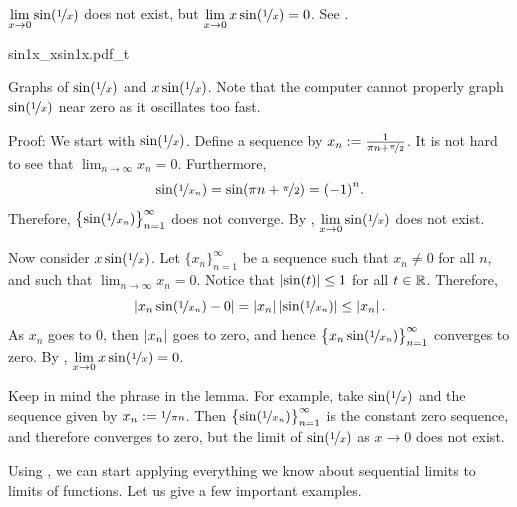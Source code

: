 \begin{example}
$\displaystyle \lim_{x \to 0} \sin( \nicefrac{1}{x} )$
does not exist, but 
$\displaystyle \lim_{x \to 0} x\sin( \nicefrac{1}{x} ) = 0$.
See .

\begin{myfigureht}
{sin1x_xsin1x.pdf_t}
\caption{Graphs of $\sin(\nicefrac{1}{x})$ and $x \sin(\nicefrac{1}{x})$.
Note that the computer cannot properly graph $\sin(\nicefrac{1}{x})$
near zero as it oscillates too fast.\label{figsin1x}}
\end{myfigureht}

Proof:
We start with $\sin(\nicefrac{1}{x})$.  Define a sequence
by
$x_n := \frac{1}{\pi n + \nicefrac{\pi}{2}}$.  It is not hard to see
that $\lim_{n\to\infty} x_n = 0$.  Furthermore,
\begin{equation*}
\sin ( \nicefrac{1}{x_n} )
=
\sin (\pi n + \nicefrac{\pi}{2})
= {(-1)}^n .
\end{equation*}
Therefore, $\bigl\{ \sin ( \nicefrac{1}{x_n} ) \bigr\}_{n=1}^\infty$ does not converge.
By
, 
$\displaystyle \lim_{x \to 0} \sin( \nicefrac{1}{x} )$ does not exist.

Now consider $x\sin(\nicefrac{1}{x})$.  Let $\{ x_n \}_{n=1}^\infty$ be a sequence
such that $x_n \not= 0$ for all $n$, and such that $\lim_{n\to\infty} x_n = 0$.
Notice that $\left\lvert {\sin(t)} \right\rvert \leq 1$ for all $t \in {\mathbb{R}}$.  Therefore,
\begin{equation*}
\left\lvert {x_n\sin(\nicefrac{1}{x_n})-0} \right\rvert
=
\left\lvert {x_n} \right\rvert\left\lvert {\sin(\nicefrac{1}{x_n})} \right\rvert
\leq
\left\lvert {x_n} \right\rvert .
\end{equation*}
As $x_n$ goes to 0, then $\left\lvert {x_n} \right\rvert$ goes to zero, and hence
$\bigl\{ x_n\sin(\nicefrac{1}{x_n}) \bigr\}_{n=1}^\infty$ converges to zero.  By
, 
$\displaystyle \lim_{x \to 0} x\sin( \nicefrac{1}{x} ) = 0$.
\end{example}

Keep in mind the phrase  in the lemma.
For example, take $\sin(\nicefrac{1}{x})$ and the sequence given by
$x_n := \nicefrac{1}{\pi n}$.
Then $\bigl\{ \sin (\nicefrac{1}{x_n}) \bigr\}_{n=1}^\infty$
is the constant zero sequence, and
therefore converges to zero, but the limit of 
$\sin(\nicefrac{1}{x})$ as $x \to 0$ does not exist.

Using , 
we can start applying everything we know about
sequential limits to limits of functions.  Let us give a few important
examples.

